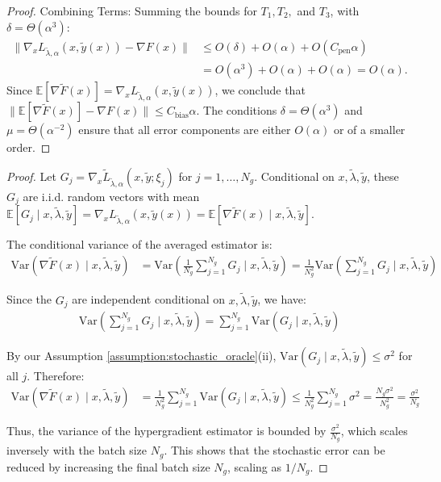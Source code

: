 \documentclass[letterpaper]{article} %
\newcommand{\1}{\mathbf{1}}
\begin{document}
\begin{proof}
Combining Terms: Summing the bounds for $T_1, T_2,$ and $T_3$, with $\delta = \Theta(\alpha^3)$:
\begin{align}
\|\nabla_x L_{\tilde{\lambda},\alpha}(x, \tilde{y}(x)) - \nabla F(x)\| &\leq O(\delta) + O(\alpha) + O(C_{\text{pen}}\alpha) \\
&= O(\alpha^3) + O(\alpha) + O(\alpha) = O(\alpha).
\end{align}
Since $\mathbb{E}[\nabla\tilde{F}(x)] = \nabla_x L_{\tilde{\lambda},\alpha}(x, \tilde{y}(x))$, we conclude that $\|\mathbb{E}[\nabla\tilde{F}(x)] - \nabla F(x)\| \leq C_{\text{bias}}\alpha$. The conditions $\delta = \Theta(\alpha^3)$ and $\mu= \Theta(\alpha^{-2})$ ensure that all error components are either $O(\alpha)$ or of a smaller order.
\end{proof}

\variancebound*
\begin{proof}
Let $G_j = \nabla_x \tilde{L}_{\tilde{\lambda}, \alpha}(x, \tilde{y};\xi_j)$ for $j=1,\dots,N_g$. Conditional on $x, \tilde{\lambda},\tilde{y}$, these $G_j$ are i.i.d. random vectors with mean $\mathbb{E}[G_j \mid x, \tilde{\lambda},\tilde{y}] = \nabla_x L_{\tilde{\lambda}, \alpha}(x, \tilde{y}(x)) = \mathbb{E}[\nabla\tilde{F}(x) \mid x, \tilde{\lambda}, \tilde{y}]$.

The conditional variance of the averaged estimator is:
\begin{align}
\text{Var}(\nabla\tilde{F}(x) \mid x, \tilde{\lambda}, \tilde{y}) &= \text{Var}\left(\frac{1}{N_g} \sum_{j=1}^{N_g} G_j \; \Bigg| \; x, \tilde{\lambda}, \tilde{y} \right) 
= \frac{1}{N_g^2} \text{Var}\left(\sum_{j=1}^{N_g} G_j \; \Bigg| \; x, \tilde{\lambda}, \tilde{y} \right)
\end{align}

Since the $G_j$ are independent conditional on $x, \tilde{\lambda}, \tilde{y}$, we have:
\begin{align}
\text{Var}\left(\sum_{j=1}^{N_g} G_j \; \Bigg| \; x, \tilde{\lambda}, \tilde{y} \right) = \sum_{j=1}^{N_g} \text{Var}(G_j \mid x, \tilde{\lambda}, \tilde{y})
\end{align}

By our Assumption \ref{assumption:stochastic_oracle}(ii), $\text{Var}(G_j \mid x, \tilde{\lambda}, \tilde{y}) \leq \sigma^2$ for all $j$. Therefore:
\begin{align}
\text{Var}(\nabla\tilde{F}(x) \mid x, \tilde{\lambda}, \tilde{y}) &= \frac{1}{N_g^2} \sum_{j=1}^{N_g} \text{Var}(G_j \mid x, \tilde{\lambda}, \tilde{y}) 
\leq \frac{1}{N_g^2} \sum_{j=1}^{N_g} \sigma^2 
= \frac{N_g \sigma^2}{N_g^2} 
= \frac{\sigma^2}{N_g}
\end{align}

Thus, the variance of the hypergradient estimator is bounded by $\frac{\sigma^2}{N_g}$, which scales inversely with the batch size $N_g$. This shows that the stochastic error can be reduced by increasing the final batch size $N_g$, scaling as $1/N_g$.
\end{proof}
\end{document}
